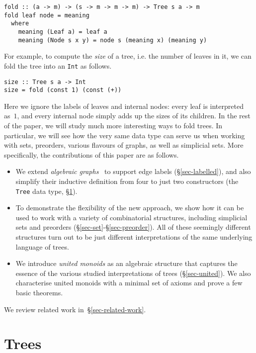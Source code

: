 \documentclass[english,submission]{programming}
\newcommand{\code}[1]{\lstinline[mathescape]|#1|}
\begin{document}
\begin{lstlisting}
fold :: (a -> m) -> (s -> m -> m -> m) -> Tree s a -> m
fold leaf node = meaning
  where
    meaning (Leaf a) = leaf a
    meaning (Node s x y) = node s (meaning x) (meaning y)
\end{lstlisting}

\noindent
For example, to compute the \emph{size} of a tree, i.e. the number of leaves in
it, we can fold the tree into an \code{Int} as follows.

\begin{lstlisting}
size :: Tree s a -> Int
size = fold (const 1) (const (+))
\end{lstlisting}

\noindent
Here we ignore the labels of leaves and internal nodes: every leaf is
interpreted as~$1$, and every internal node simply adds up the sizes of its
children. In the rest of the paper, we will study much more interesting ways to
fold trees. In particular, we will see how the very same data type can serve us
when working with sets, preorders, various flavours of graphs, as well as
simplicial sets. More specifically, the contributions of this paper are as
follows.

\begin{itemize}
  \item We extend \emph{algebraic graphs}~\cite{mokhov_alga} to support edge
  labels (\S\ref{sec-labelled}), and also simplify their inductive definition
  from four to just two constructors (the \code{Tree} data type,
  \S\ref{sec-tree}).

  \item To demonstrate the flexibility of the new approach, we show how it can
  be used to work with a variety of combinatorial structures, including
  simplicial sets and preorders (\S\ref{sec-set}-\S\ref{sec-preorder}). All of
  these seemingly different structures turn out to be just different
  interpretations of the same underlying language of trees.

  \item We introduce \emph{united monoids} as an algebraic structure that
  captures the essence of the various studied interpretations of trees
  (\S\ref{sec-united}). We also characterise united monoids with a minimal set
  of axioms and prove a few basic theorems.
\end{itemize}

\noindent
We review related work in~\S\ref{sec-related-work}.

\section{Trees}\label{sec-tree}
\end{document}
